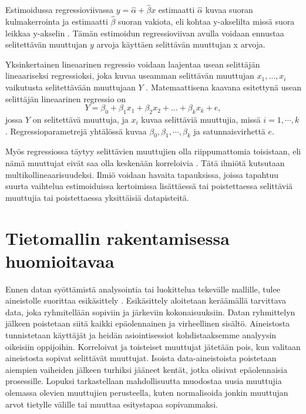 Estimoidussa regressioviivassa $y = \hat{\alpha} + \hat{\beta}x$ estimaatti $\hat{\alpha}$ kuvaa suoran kulmakerrointa ja estimaatti $\hat{\beta}$ suoran vakiota, eli kohtaa y-akselilta missä suora leikkaa y-akselin \citep{rossIntroductoryStatistics2017}. Tämän estimoidun regressioviivan avulla voidaan ennustaa selitettävän muuttujan $y$ arvoja käyttäen selittävän muuttujan x arvoja.

Yksinkertainen lineaarinen regressio voidaan laajentaa usean selittäjän lineaariseksi regressioksi, joka kuvaa useamman selittävän muuttujan $x_1, \ldots, x_i$ vaikutusta selitettävään muuttujaan $Y$ \citep{rossIntroductoryStatistics2017}. Matemaattisena kaavana esitettynä usean selittäjän lineaarinen regressio on $$Y = \beta_0 + \beta_1x_1 + \beta_2x_2 + \ldots + \beta_kx_k + e,$$ jossa $Y$ on selitettävä muuttuja, ja $x_i$ kuvaa selittäviä muuttujia, missä $i = 1, \cdots, k$. Regressioparametrejä yhtälössä kuvaa $\beta_0, \beta_1, \cdots, \beta_k$ ja satunnaisvirhettä $e$.

Myös regressiossa täytyy selittävien muuttujien olla riippumattomia toisistaan, eli nämä muuttujat eivät saa olla keskenään korreloivia \citep{daoudMulticollinearityRegressionAnalysis2017}. Tätä ilmiötä kutsutaan multikollineaarisuudeksi. Ilmiö voidaan havaita tapauksissa, joissa tapahtuu suurta vaihtelua estimoiduissa kertoimissa lisättäessä tai poistettaessa selittäviä muuttujia tai poistettaessa yksittäisiä datapisteitä.

\section{Tietomallin rakentamisessa huomioitavaa}
Ennen datan syöttämistä analysointia tai luokittelua tekevälle mallille, tulee aineistolle suorittaa esikäsittely \citep{romeroSurveyPreProcessingEducational2014}. Esikäsittely aloitetaan keräämällä tarvittava data, joka ryhmitellään sopiviin ja järkeviin kokonaisuuksiin. Datan ryhmittelyn jälkeen poistetaan siitä kaikki epäolennainen ja virheellinen sisältö. Aineistosta tunnistetaan käyttäjät ja heidän asiointisessiot kohdistaaksemme analyysin oikeisiin oppijoihin. Korreloivat ja toisteiset muuttujat jätetään pois, kun valitaan aineistosta sopivat selittävät muuttujat. Isoista data-aineistoista poistetaan aiempien vaiheiden jälkeen turhiksi jääneet kentät, jotka olisivat epäolennaisia prosessille. Lopuksi tarkastellaan mahdollisuutta muodostaa uusia muuttujia olemassa olevien muuttujien perusteella, kuten normalisoida jonkin muuttujan arvot tietylle välille tai muuttaa esitystapaa sopivammaksi.

